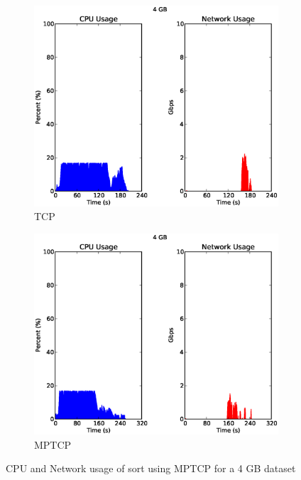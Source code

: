 \documentclass[a4paper,12pt,twoside,openright]{report}
\begin{document}
\begin{figure}[h!]
        \begin{subfigure}[b]{0.49\textwidth}
                \centering
                \includegraphics[width=\textwidth]{64maps_tcp.csv.eps}
                \caption{TCP}
                \label{fig:4GBsortrestcp}
        \end{subfigure}%
        \begin{subfigure}[b]{0.49\textwidth}
                \centering
                \includegraphics[width=\textwidth]{64maps_mptcp.csv.eps}
                \caption{MPTCP}
                \label{fig:4GBsortresmptcp}
        \end{subfigure}
        \caption{CPU and Network usage of sort using MPTCP for a 4 GB dataset}
        \label{chap:eval:sec:ciel:fig:sortresmptcp}
\end{figure}
\end{document}

